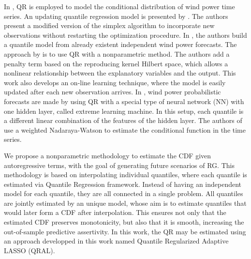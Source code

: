 %






In \cite{gallego2016line,moller_time-adaptive_2008,nielsen2006,bremnes_probabilistic_2004,wan_direct_2017}, QR is employed to model the conditional distribution of wind power time series.
An updating quantile regression model is presented by \cite{moller_time-adaptive_2008}. The authors present a modified version of the simplex algorithm to incorporate new observations without restarting the optimization procedure.
In \cite{nielsen2006}, the authors build a quantile model from already existent independent wind power forecasts.
The approach by \cite{gallego2016line} is to use QR with a nonparametric method. The authors add a penalty term based on the reproducing kernel Hilbert space, which allows a nonlinear relationship between the explanatory variables and the output. This work also develops an on-line learning technique, where the model is easily updated after each new observation arrives.
In \cite{wan_direct_2017}, wind power probabilistic forecasts are made by using QR with a special type of neural network (NN) with one hidden layer, called extreme learning machine. In this setup, each quantile is a different linear combination of the features of the hidden layer.
The authors of \cite{cai_regression_2002} use a weighted Nadaraya-Watson to estimate the conditional function in the time series.


We propose a nonparametric methodology to estimate the CDF given autoregressive terms, with the goal of generating future scenarios of RG. This methodology is based on interpolating individual quantiles, where each quantile is estimated via Quantile Regression framework.
Instead of having an independent model for each quantile, they are all connected in a single problem. All quantiles are jointly estimated by an unique model, whose aim is to estimate quantiles that would later form a CDF after interpolation. This ensures not only that the estimated CDF preserves monotonicity, but also that it is smooth, increasing the out-of-sample predictive assertivity.
In this work, the QR may be estimated using an approach developped in this work named Quantile Regularized Adaptive LASSO (QRAL).


